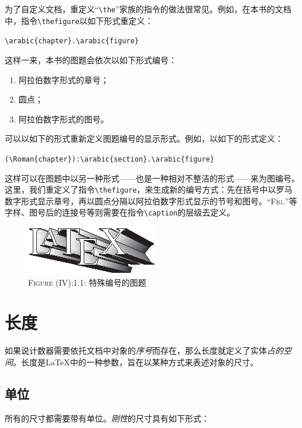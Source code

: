 为了自定义文档，重定义“\verb|\the|”家族的指令的做法很常见。例如，在本书的文档中，指令\verb|\thefigure|以如下形式重定义：

\begin{dmd}
\verb|\arabic{chapter}.\arabic{figure}|
\end{dmd}

这样一来，本书的图题会依次以如下形式编号：

\begin{enumerate}
  \item 阿拉伯数字形式的章号；
  \item 圆点；
  \item 阿拉伯数字形式的图号。
\end{enumerate}

可以以如下的形式重新定义图题编号的显示形式。例如，以如下的形式定义：

\begin{dmd}
\verb|(\Roman{chapter}):\arabic{section}.\arabic{figure}|
\end{dmd}

这样可以在图题中以另一种形式——也是一种相对不整洁的形式——来为图编号。这里，我们重定义了指令\verb|\thefigure|，来生成新的编号方式：先在括号中以罗马数字形式显示章号，再以圆点分隔以阿拉伯数字形式显示的节号和图号。“\textsc{Fig.}”等字样、图号后的连接号等则需要在指令\verb|\caption|的层级去定义。

\begin{figure}[ht]
  \centering
  \includegraphics{img/latex.eps}\\
  \textsc{Figure} (IV):1.1: 特殊编号的图题
\end{figure}

\section{长度}

如果说计数器需要依托文档中对象的\emph{序号}而存在，那么长度就定义了实体\emph{占的空间}。长度是\LaTeX 中的一种参数，旨在以某种方式来表述对象的尺寸。

\subsection{单位}

所有的尺寸都需要带有单位。\emph{刚性}的尺寸具有如下形式：

